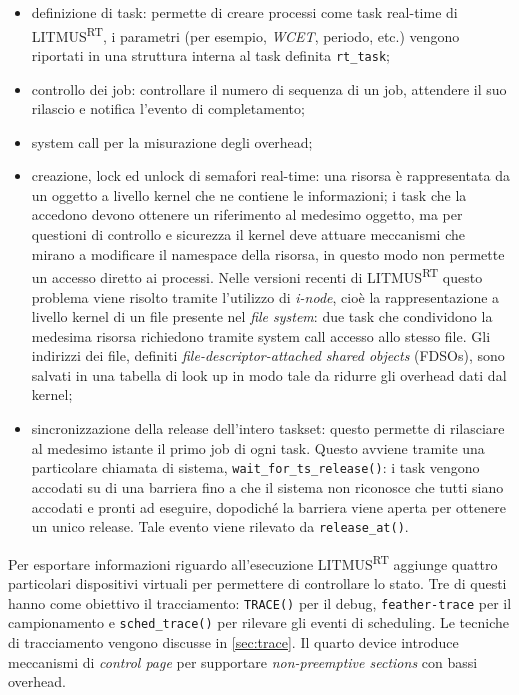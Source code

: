 \begin{appendices}
\begin{itemize}
	\item definizione di task: permette di creare processi come task real-time di LITMUS\textsuperscript{RT}, i parametri (per esempio, \textit{WCET}, periodo, etc.) vengono riportati in una struttura interna al task definita \texttt{rt\_task};
	\item controllo dei job: controllare il numero di sequenza di un job, attendere il suo rilascio e notifica l'evento di completamento;
	\item system call per la misurazione degli overhead;
	\item creazione, lock ed unlock di semafori real-time: una risorsa è rappresentata da un oggetto a livello kernel che ne contiene le informazioni; i task che la accedono devono ottenere un riferimento al medesimo oggetto, ma per questioni di controllo e sicurezza il kernel deve attuare meccanismi che mirano a modificare il namespace della risorsa, in questo modo non permette un accesso diretto ai processi. Nelle versioni recenti di LITMUS\textsuperscript{RT} questo problema viene risolto tramite l'utilizzo di \textit{i-node}, cioè la rappresentazione a livello kernel di un file presente nel \textit{file system}: due task che condividono la medesima risorsa richiedono tramite system call accesso allo stesso file. Gli indirizzi dei file, definiti \textit{file-descriptor-attached shared objects} (FDSOs), sono salvati in una tabella di look up in modo tale da ridurre gli overhead dati dal kernel;
	\item sincronizzazione della release dell'intero taskset: questo permette di rilasciare al medesimo istante il primo job di ogni task. Questo avviene tramite una particolare chiamata di sistema, \texttt{wait\_for\_ts\_release()}: i task vengono accodati su di una barriera fino a che il sistema non riconosce che tutti siano accodati e pronti ad eseguire, dopodiché la barriera viene aperta per ottenere un unico release. Tale evento viene rilevato da \texttt{release\_at()}.\\
\end{itemize}

\noindent Per esportare informazioni riguardo all'esecuzione LITMUS\textsuperscript{RT} aggiunge quattro particolari dispositivi virtuali per permettere di controllare lo stato. Tre di questi hanno come obiettivo il tracciamento: \texttt{TRACE()} per il debug, \texttt{feather-trace} per il campionamento e \texttt{sched\_trace()} per rilevare gli eventi di scheduling. Le tecniche di tracciamento vengono discusse in \ref{sec:trace}. Il quarto device introduce meccanismi di \textit{control page} per supportare \textit{non-preemptive sections} con bassi overhead.\\


\end{appendices}
